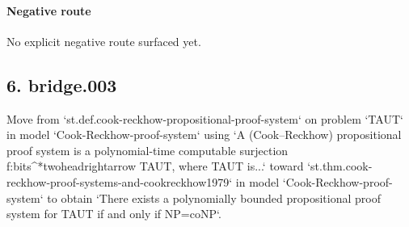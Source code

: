 \documentclass[11pt]{article}
\begin{document}
\paragraph{Negative route}
No explicit negative route surfaced yet.
\subsection*{6. bridge.003}
Move from `st.def.cook-reckhow-propositional-proof-system` on problem `TAUT` in model `Cook-Reckhow-proof-system` using `A (Cook--Reckhow) propositional proof system is a polynomial-time computable surjection f:bits\textasciicircum{}*twoheadrightarrow TAUT, where TAUT is...` toward `st.thm.cook-reckhow-proof-systems-and-cookreckhow1979` in model `Cook-Reckhow-proof-system` to obtain `There exists a polynomially bounded propositional proof system for TAUT if and only if NP=coNP`.
\end{document}
